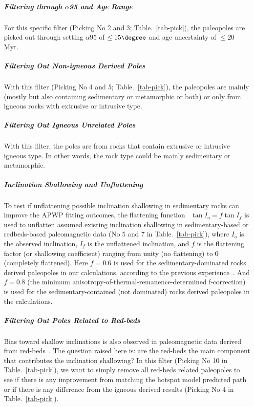 \subparagraph{Filtering through $\alpha$95 and Age Range}

For this specific filter (Picking No 2 and 3; Table.~\ref{tab-pick}), the
paleopoles are picked out through setting $\alpha$95 of $\leq15\degree$ and age
uncertainty of $\leq20$ Myr.

\subparagraph{Filtering Out Non-igneous Derived Poles}

With this filter (Picking No 4 and 5; Table.~\ref{tab-pick}), the paleopoles are
mainly (mostly but also containing sedimentary or metamorphic or both) or only
from igneous rocks with extrusive or intrusive type.

\subparagraph{Filtering Out Igneous Unrelated Poles}

With this filter, the poles are from rocks that contain extrusive or intrusive
igneous type. In other words, the rock type could be mainly sedimentary or
metamorphic.

\subparagraph{Inclination Shallowing and Unflattening}

To test if unflattening possible inclination shallowing in sedimentary rocks can
improve the APWP fitting outcomes, the flattening function~\cite{K55} $\tan I_o
= f \tan I_f$ is used to unflatten assumed existing inclination shallowing in
sedimentary-based or redbeds-based paleomagnetic data (No $5$ and $7$ in
Table.~\ref{tab-pick}), where $I_o$ is the observed inclination, $I_f$ is the
unflattened inclination, and $f$ is the flattening factor (or shallowing
coefficient) ranging from unity (no flattening) to 0 (completely flattened).
Here $f=0.6$ is used for the sedimentary-dominated rocks derived paleopoles in
our calculations, according to the previous experience~\cite{T12}. And $f=0.8$
(the minimum anisotropy-of-thermal-remanence-determined
f-correction)~\cite{D11,Do11} is used for the sedimentary-contained (not
dominated) rocks derived paleopoles in the calculations.

\subparagraph{Filtering Out Poles Related to Red-beds}

Bias toward shallow inclinations is also observed in paleomagnetic data derived
from red-beds~\cite{T04}. The question raised here is: are the red-beds the main
component that contributes the inclination shallowing? In this filter (Picking
No 10 in Table.~\ref{tab-pick}), we want to simply remove all
red-beds related paleopoles to see if there is any improvement from matching the
hotspot model predicted path or if there is any difference from the igneous
derived results (Picking No 4 in Table.~\ref{tab-pick}).

